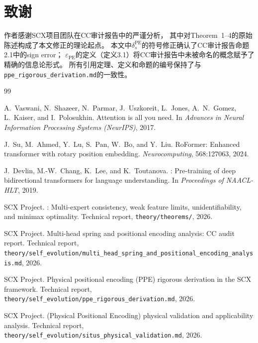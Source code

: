 \documentclass[11pt,a4paper]{article}
\theoremstyle{remark}
\DeclareMathOperator{\PE}{PE}
\begin{document}
\section*{致谢}

作者感谢SCX项目团队在CC审计报告\cite{scx2026cc_audit}中的严谨分析，
其中对Theorem~1--4的原始陈述构成了本文修正的理论起点。
本文中$\delta_s^{\PE}$的符号修正确认了CC审计报告命题2.1中的sign error；
$\varepsilon_{\PE}$的定义（定义3.1）将CC审计报告中未被命名的概念赋予了精确的信息论形式。
所有引用定理、定义和命题的编号保持了与\texttt{ppe\_rigorous\_derivation.md}的一致性。

\begin{thebibliography}{99}

A.~Vaswani, N.~Shazeer, N.~Parmar, J.~Uszkoreit, L.~Jones, A.~N.~Gomez,
L.~Kaiser, and I.~Polosukhin.
\newblock Attention is all you need.
\newblock In \emph{Advances in Neural Information Processing Systems (NeurIPS)},
  2017.

J.~Su, M.~Ahmed, Y.~Lu, S.~Pan, W.~Bo, and Y.~Liu.
\newblock Ro{Former}: Enhanced transformer with rotary position embedding.
\newblock \emph{Neurocomputing}, 568:127063, 2024.

J.~Devlin, M.-W.~Chang, K.~Lee, and K.~Toutanova.
: Pre-training of deep bidirectional transformers for language
  understanding.
\newblock In \emph{Proceedings of NAACL-HLT}, 2019.

SCX Project.
: Multi-expert consistency, weak feature limits,
  unidentifiability, and minimax optimality.
\newblock Technical report, \texttt{theory/theorems/}, 2026.

SCX Project.
\newblock Multi-head spring and positional encoding analysis: {CC} audit report.
\newblock Technical report,
  \texttt{theory/self\_evolution/multi\_head\_spring\_and\_positional\_encoding\_analysis.md},
  2026.

SCX Project.
\newblock Physical positional encoding ({PPE}) rigorous derivation in the {SCX}
  framework.
\newblock Technical report,
  \texttt{theory/self\_evolution/ppe\_rigorous\_derivation.md}, 2026.

SCX Project.
 ({Physical Positional Encoding}) physical validation and
  applicability analysis.
\newblock Technical report, \texttt{theory/self\_evolution/situs\_physical\_validation.md},
  2026.


\end{thebibliography}
\end{document}
